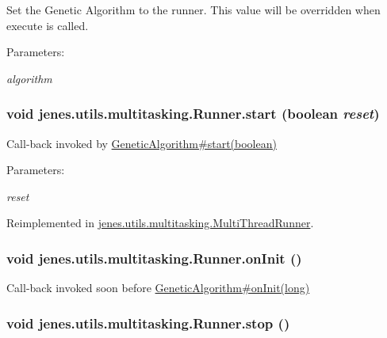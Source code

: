 Set the Genetic Algorithm to the runner. This value will be overridden when execute is called. \begin{Desc}
\item[Parameters:]
\begin{description}
\item[{\em algorithm}]\end{description}
\end{Desc}
\hypertarget{classjenes_1_1utils_1_1multitasking_1_1_runner_5dc1ed49495150ff26ec5194010b00e4}{
\subsubsection[start]{\setlength{\rightskip}{0pt plus 5cm}void jenes.utils.multitasking.Runner.start (boolean {\em reset})}}
\label{classjenes_1_1utils_1_1multitasking_1_1_runner_5dc1ed49495150ff26ec5194010b00e4}


Call-back invoked by \hyperlink{}{GeneticAlgorithm\#start(boolean)} \begin{Desc}
\item[Parameters:]
\begin{description}
\item[{\em reset}]\end{description}
\end{Desc}


Reimplemented in \hyperlink{classjenes_1_1utils_1_1multitasking_1_1_multi_thread_runner_52fc59a28c3187e84b871b9b823b7f43}{jenes.utils.multitasking.MultiThreadRunner}.\hypertarget{classjenes_1_1utils_1_1multitasking_1_1_runner_4c4d4a0cd7aec110d60da5c660903398}{
\subsubsection[onInit]{\setlength{\rightskip}{0pt plus 5cm}void jenes.utils.multitasking.Runner.onInit ()}}
\label{classjenes_1_1utils_1_1multitasking_1_1_runner_4c4d4a0cd7aec110d60da5c660903398}


Call-back invoked soon before \hyperlink{}{GeneticAlgorithm\#onInit(long)} \hypertarget{classjenes_1_1utils_1_1multitasking_1_1_runner_c89e8ac54daba2e326e687662ff9f7b0}{
\subsubsection[stop]{\setlength{\rightskip}{0pt plus 5cm}void jenes.utils.multitasking.Runner.stop ()}}
\label{classjenes_1_1utils_1_1multitasking_1_1_runner_c89e8ac54daba2e326e687662ff9f7b0}


